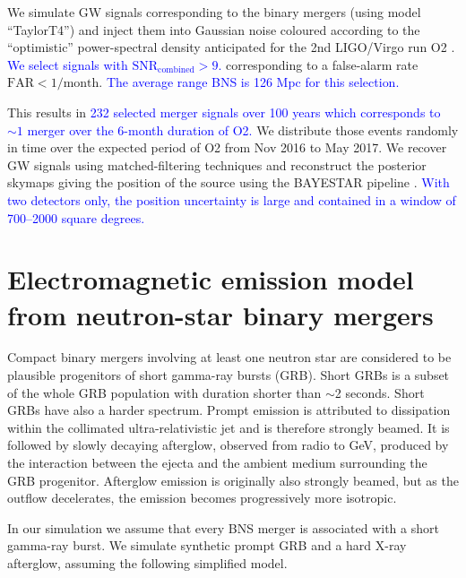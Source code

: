 \documentclass[11pt]{article}
\begin{document}
We simulate GW signals corresponding to the binary mergers (using model
``TaylorT4'') and inject them into Gaussian noise coloured according to the
``optimistic'' power-spectral density anticipated for the 2nd LIGO/Virgo run O2
\citep{2016LRR....19....1A}. \textcolor{blue}{We select signals with $\mathrm{SNR}_{\mathrm{combined}} > 9$.}
corresponding to a false-alarm rate $\mathrm{FAR} < 1/\mathrm{month}$. \textcolor{blue}{The
average range BNS is 126 Mpc for this selection.}

This results in \textcolor{blue}{232 selected merger signals over 100 years which corresponds to
$\sim 1$ merger over the 6-month duration of O2.} We distribute those events
randomly in time over the expected period of O2 from Nov 2016 to May 2017. We
recover GW signals using matched-filtering techniques and reconstruct the
posterior skymaps giving the position of the source using the BAYESTAR pipeline
\citep{2016PhRvD..93b4013S}.  \textcolor{blue}{With two detectors only, the position uncertainty is
large and contained in a window of 700--2000 square degrees.}

\section*{Electromagnetic emission model from neutron-star binary mergers}

Compact binary mergers involving at least one neutron star are considered to be
plausible progenitors of short gamma-ray bursts (GRB). Short GRBs is a
subset of the whole GRB population with duration shorter than $\sim$2
seconds. Short GRBs have also a harder spectrum. Prompt emission is attributed
to dissipation within the collimated ultra-relativistic jet and is therefore
strongly beamed. It is followed by slowly decaying afterglow, observed from
radio to GeV, produced by the interaction between the ejecta and the ambient
medium surrounding the GRB progenitor. Afterglow emission is originally also
strongly beamed, but as the outflow decelerates, the emission becomes
progressively more isotropic.

In our simulation we assume that every BNS merger is associated with a short
gamma-ray burst. We simulate synthetic prompt GRB and a hard X-ray afterglow,
assuming the following simplified model. \\

\end{document}
